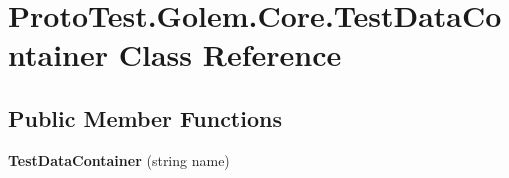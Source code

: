 \hypertarget{class_proto_test_1_1_golem_1_1_core_1_1_test_data_container}{\section{Proto\-Test.\-Golem.\-Core.\-Test\-Data\-Container Class Reference}
\label{class_proto_test_1_1_golem_1_1_core_1_1_test_data_container}
}
\subsection*{Public Member Functions}
\begin{DoxyCompactItemize}
\item 
\hypertarget{class_proto_test_1_1_golem_1_1_core_1_1_test_data_container_a053fe4c004b94d9991136281fcf20e07}{{\bfseries Test\-Data\-Container} (string name)}\label{class_proto_test_1_1_golem_1_1_core_1_1_test_data_container_a053fe4c004b94d9991136281fcf20e07}

\end{DoxyCompactItemize}
